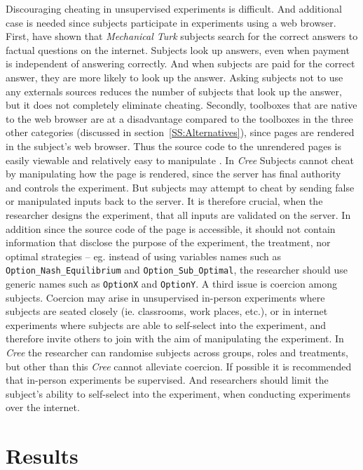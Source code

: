 \documentclass[preprint, 12pt]{elsarticle}
\newcommand{\Cree}{\emph{Cree}\xspace}
\begin{document}
Discouraging cheating in unsupervised experiments is difficult. And additional case is needed since subjects participate in experiments using a web browser. First, \cite{Goodman_Cryder_Cheema_2013} have shown that \emph{Mechanical Turk} subjects search for the correct answers to factual questions on the internet. Subjects look up answers, even when payment is independent of answering correctly. And when subjects are paid for the correct answer, they are more likely to look up the answer. Asking subjects not to use any externals sources reduces the number of subjects that look up the answer, but it does not completely eliminate cheating. Secondly, toolboxes that are native to the web browser are at a disadvantage compared to the toolboxes in the three other categories (discussed in section~\ref{SS:Alternatives}), since pages are rendered in the subject's web browser. Thus the source code to the unrendered pages is easily viewable and relatively easy to manipulate \citep[25m. 12s.]{Hawkes_2011}. In \Cree Subjects cannot cheat by manipulating how the page is rendered, since the server has final authority and controls the experiment. But subjects may attempt to cheat by sending false or manipulated inputs back to the server. It is therefore crucial, when the researcher designs the experiment, that all inputs are validated on the server. In addition since the source code of the page is accessible, it should not contain information that disclose the purpose of the experiment, the treatment, nor optimal strategies -- eg. instead of using variables names such as \texttt{Option\_Nash\_Equilibrium} and \texttt{Option\_Sub\_Optimal}, the researcher should use generic names such as \texttt{OptionX} and \texttt{OptionY}. A third issue is coercion among subjects. Coercion may arise in unsupervised in-person experiments where subjects are seated closely (ie. classrooms, work places, etc.), or in internet experiments where subjects are able to self-select into the experiment, and therefore invite others to join with the aim of manipulating the experiment. In \Cree the researcher can randomise subjects across groups, roles and treatments, but other than this \Cree cannot alleviate coercion. If possible it is recommended that in-person experiments be supervised. And researchers should limit the subject's ability to self-select into the experiment, when conducting experiments over the internet. 


\section{Results}
\label{S:Results}
\end{document}
